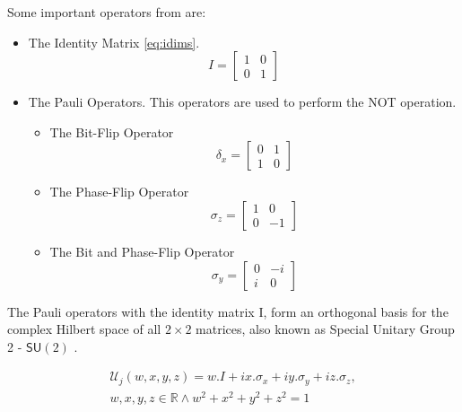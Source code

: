 \documentclass[10pt,twocolumn]{llncs}
\begin{document}
Some important operators from are:

\begin{itemize}
\item The Identity Matrix \ref{eq:idims}.
\begin{equation}
\label{eq:idims}
I=\left[\begin{array}{cc}
1 & 0\\
0 & 1
\end{array}\right]
\end{equation}

\item The Pauli Operators. This operators are used to perform the NOT operation. 
	\begin{itemize}
		\item The Bit-Flip Operator\begin{equation}
\label{eq:idims_1}
\delta_{x} =\left[\begin{array}{cc}
0 & 1\\
1 & 0
\end{array}\right]
\end{equation}
		\item The Phase-Flip Operator\begin{equation}
\label{eq:idims_2}
\sigma_{z} =\left[\begin{array}{cc}
1 & 0\\
0 & -1
\end{array}\right]
\end{equation}
\item The Bit and Phase-Flip Operator\begin{equation}
\label{eq:idims_3}
\sigma_{y}=\left[\begin{array}{cc}
0 & -i\\
i & 0
\end{array}\right]
\end{equation}
	\end{itemize}

\end{itemize}

The Pauli operators with the identity matrix I, form an orthogonal basis for the complex Hilbert space of all $2 \times 2$ matrices, also known as Special Unitary Group 2 - $\mathsf{SU}(2)$ \cite{Letters2002}.

\begin{equation}
\begin{split}
\mathcal{U}_{j}(w,x,y,z)=w.I + ix.\sigma_{x} + iy.\sigma_{y} + iz.\sigma_{z}, \\  w,x,y,z \in \mathbb{R} \wedge  
w^2 + x^2 + y^2 + z^2 =1 
\end{split}
\label{eq:general_unitary_special_one}
\end{equation}
\end{document}
